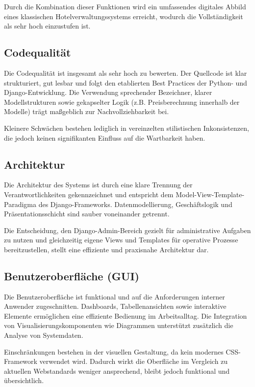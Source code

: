 Durch die Kombination dieser Funktionen wird ein umfassendes digitales Abbild eines klassischen Hotelverwaltungssystems erreicht, wodurch die Vollständigkeit als sehr hoch einzustufen ist.

\subsection{Codequalität}

Die Codequalität ist insgesamt als sehr hoch zu bewerten. Der Quellcode ist klar strukturiert, gut lesbar und folgt den etablierten Best Practices der Python- und Django-Entwicklung. Die Verwendung sprechender Bezeichner, klarer Modellstrukturen sowie gekapselter Logik (z.B. Preisberechnung innerhalb der Modelle) trägt maßgeblich zur Nachvollziehbarkeit bei.

Kleinere Schwächen bestehen lediglich in vereinzelten stilistischen Inkonsistenzen, die jedoch keinen signifikanten Einfluss auf die Wartbarkeit haben.

\subsection{Architektur}

Die Architektur des Systems ist durch eine klare Trennung der Verantwortlichkeiten gekennzeichnet und entspricht dem Model-View-Template-Paradigma des Django-Frameworks. Datenmodellierung, Geschäftslogik und Präsentationsschicht sind sauber voneinander getrennt.

Die Entscheidung, den Django-Admin-Bereich gezielt für administrative Aufgaben zu nutzen und gleichzeitig eigene Views und Templates für operative Prozesse bereitzustellen, stellt eine effiziente und praxisnahe Architektur dar.

\subsection{Benutzeroberfläche (GUI)}

Die Benutzeroberfläche ist funktional und auf die Anforderungen interner Anwender zugeschnitten. Dashboards, Tabellenansichten sowie interaktive Elemente ermöglichen eine effiziente Bedienung im Arbeitsalltag. Die Integration von Visualisierungskomponenten wie Diagrammen unterstützt zusätzlich die Analyse von Systemdaten.

Einschränkungen bestehen in der visuellen Gestaltung, da kein modernes CSS-Framework verwendet wird. Dadurch wirkt die Oberfläche im Vergleich zu aktuellen Webstandards weniger ansprechend, bleibt jedoch funktional und übersichtlich.

